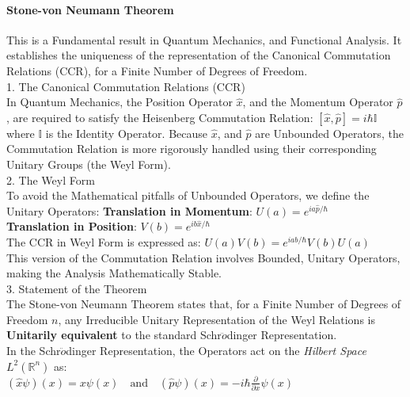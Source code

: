 \documentclass[a4paper, 10pt, onepage]{elegantbook}
\begin{document}
{\newpage

\paragraph{Stone-von Neumann Theorem}  

\noindent

This is a Fundamental result in Quantum Mechanics, and Functional Analysis. It establishes the uniqueness of the representation of the Canonical Commutation Relations (CCR), for a Finite Number of Degrees of Freedom.  \\

    1. The Canonical Commutation Relations (CCR)  \\

In Quantum Mechanics, the Position Operator $\hat{x}$, and the Momentum Operator $\hat{p}$, are required to satisfy the Heisenberg Commutation Relation:
$[\hat{x}, \hat{p}] = i\hbar \mathbb{I} $
where $\mathbb{I}$ is the Identity Operator. Because $\hat{x}$, and $\hat{p}$ are Unbounded Operators, the Commutation Relation is more rigorously handled using their corresponding Unitary Groups (the Weyl Form).  \\

    2. The Weyl Form  \\

To avoid the Mathematical pitfalls of Unbounded Operators, we define the Unitary Operators:
 \textbf{Translation in Momentum}: $U(a) = e^{i a \hat{p} / \hbar}$  \\
 \textbf{Translation in Position}: $V(b) = e^{i b \hat{x} / \hbar}$  \\

The CCR in Weyl Form is expressed as:
$U(a)V(b) = e^{iab/\hbar} V(b)U(a)$  \\
This version of the Commutation Relation involves Bounded, Unitary Operators, making the Analysis Mathematically Stable.  \\

    3. Statement of the Theorem  \\

The Stone-von Neumann Theorem states that, for a Finite Number of Degrees of Freedom $n$, any Irreducible Unitary Representation of the Weyl Relations is \textbf{Unitarily equivalent} to the standard Schr$\ddot{o}$dinger Representation.  \\

In the Schr$\ddot{o}$dinger Representation, the Operators act on the \emph{Hilbert Space} $L^2(\mathbb{R}^n)$ as: \\
$(\hat{x} \psi)(x) = x \psi(x) \quad \text{and} \quad (\hat{p} \psi)(x) = -i\hbar \frac{\partial}{\partial x} \psi(x)$  \\

}
\end{document}
